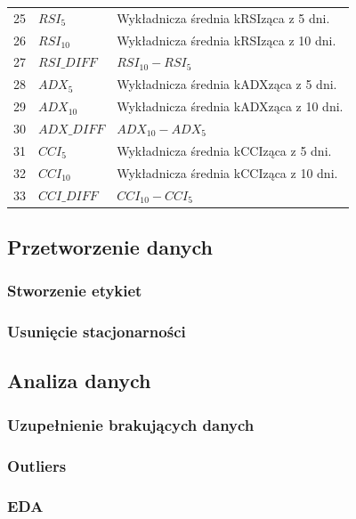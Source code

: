\documentclass[a4paper, twoside, 11pt, openright]{article}
\begin{document}
\begin{longtable}[c]{| m{0.5cm} m{3cm} m{10cm}|}
  25 & $RSI_{5}$ & Wykładnicza średnia kRSIząca z 5 dni. \\
 26 & $RSI_{10}$ & Wykładnicza średnia kRSIząca z 10 dni. \\
 27 & $RSI\_DIFF$ & $RSI_{10}-RSI_{5}$ \\
  28 & $ADX_{5}$ & Wykładnicza średnia kADXząca z 5 dni. \\
 29 & $ADX_{10}$ & Wykładnicza średnia kADXząca z 10 dni. \\
 30 & $ADX\_DIFF$ & $ADX_{10}-ADX_{5}$ \\
  31 & $CCI_{5}$ & Wykładnicza średnia kCCIząca z 5 dni. \\
 32 & $CCI_{10}$ & Wykładnicza średnia kCCIząca z 10 dni. \\
 33 & $CCI\_DIFF$ & $CCI_{10}-CCI_{5}$ \\
 
\end{longtable}

\subsection{Przetworzenie danych}

\subsubsection{Stworzenie etykiet}

\subsubsection{Usunięcie stacjonarności}

\subsection{Analiza danych}

\subsubsection{Uzupełnienie brakujących danych}

\subsubsection{Outliers}

\subsubsection{EDA}
\end{document}
